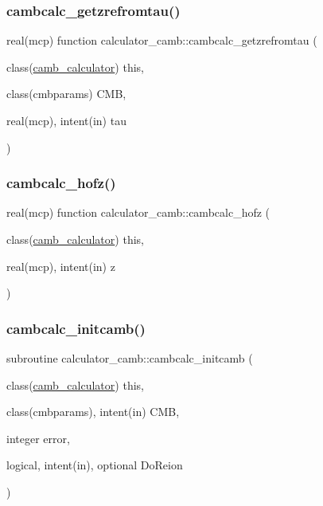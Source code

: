 \subsubsection{\texorpdfstring{cambcalc\+\_\+getzrefromtau()}{cambcalc\_getzrefromtau()}}
{\footnotesize\ttfamily real(mcp) function calculator\+\_\+camb\+::cambcalc\+\_\+getzrefromtau (\begin{DoxyParamCaption}\item[{class(\mbox{\hyperlink{structcalculator__camb_1_1camb__calculator}{camb\+\_\+calculator}})}]{this,  }\item[{class(cmbparams)}]{C\+MB,  }\item[{real(mcp), intent(in)}]{tau }\end{DoxyParamCaption})\hspace{0.3cm}{\ttfamily [private]}}

\mbox{\label{namespacecalculator__camb_a10e6be2c2d0ef7cb7741dbce3dbc88a9}} 
\subsubsection{\texorpdfstring{cambcalc\+\_\+hofz()}{cambcalc\_hofz()}}
{\footnotesize\ttfamily real(mcp) function calculator\+\_\+camb\+::cambcalc\+\_\+hofz (\begin{DoxyParamCaption}\item[{class(\mbox{\hyperlink{structcalculator__camb_1_1camb__calculator}{camb\+\_\+calculator}})}]{this,  }\item[{real(mcp), intent(in)}]{z }\end{DoxyParamCaption})}

\mbox{\label{namespacecalculator__camb_ab67fcdadb23a73d5747a682c87304c0b}} 
\subsubsection{\texorpdfstring{cambcalc\+\_\+initcamb()}{cambcalc\_initcamb()}}
{\footnotesize\ttfamily subroutine calculator\+\_\+camb\+::cambcalc\+\_\+initcamb (\begin{DoxyParamCaption}\item[{class(\mbox{\hyperlink{structcalculator__camb_1_1camb__calculator}{camb\+\_\+calculator}})}]{this,  }\item[{class(cmbparams), intent(in)}]{C\+MB,  }\item[{integer}]{error,  }\item[{logical, intent(in), optional}]{Do\+Reion }\end{DoxyParamCaption})}

